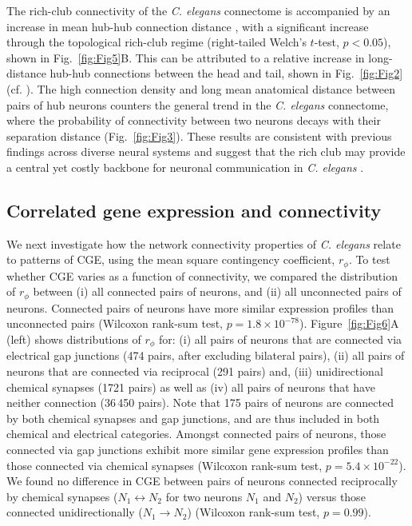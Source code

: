 \documentclass[10pt,letterpaper]{article}
\begin{document}
The rich-club connectivity of the \emph{C. elegans} connectome is accompanied by an increase in mean hub-hub connection distance \cite{Towlson2013}, with a significant increase through the topological rich-club regime (right-tailed Welch's $t$-test, $p < 0.05$), shown in Fig.~\ref{fig:Fig5}B.
This can be attributed to a relative increase in long-distance hub-hub connections between the head and tail, shown in Fig.~\ref{fig:Fig2} (cf. ).
The high connection density and long mean anatomical distance between pairs of hub neurons counters the general trend in the \emph{C. elegans} connectome, where the probability of connectivity between two neurons decays with their separation distance (Fig.~\ref{fig:Fig3}).
These results are consistent with previous findings across diverse neural systems and suggest that the rich club may provide a central yet costly backbone for neuronal communication in \emph{C. elegans} \cite{vandenHeuvel:2012kh, Towlson2013}.

\subsection*{Correlated gene expression and connectivity}

We next investigate how the network connectivity properties of \emph{C. elegans} relate to patterns of CGE, using the mean square contingency coefficient, $r_\phi$.
To test whether CGE varies as a function of connectivity, we compared the distribution of $r_\phi$ between
(i) all connected pairs of neurons, and
(ii) all unconnected pairs of neurons.
Connected pairs of neurons have more similar expression profiles than unconnected pairs (Wilcoxon rank-sum test, $p = 1.8 \times 10^{-78}$).
Figure~\ref{fig:Fig6}A (left) shows distributions of $r_\phi$ for:
(i) all pairs of neurons that are connected via electrical gap junctions (474 pairs, after excluding bilateral pairs),
(ii) all pairs of neurons that are connected via reciprocal (291 pairs) and,
(iii) unidirectional chemical synapses (1721 pairs) as well as
(iv) all pairs of neurons that have neither connection (36\,450 pairs).
Note that 175 pairs of neurons are connected by both chemical synapses and gap junctions, and are thus included in both chemical and electrical categories.
Amongst connected pairs of neurons, those connected via gap junctions exhibit more similar gene expression profiles than those connected via chemical synapses (Wilcoxon rank-sum test, $p = 5.4 \times 10^{-22}$).
We found no difference in CGE between pairs of neurons connected reciprocally by chemical synapses ($N_1 \leftrightarrow N_2$ for two neurons $N_1$ and $N_2$) versus those connected unidirectionally ($N_1 \rightarrow N_2$) (Wilcoxon rank-sum test, $p = 0.99$).
\end{document}

